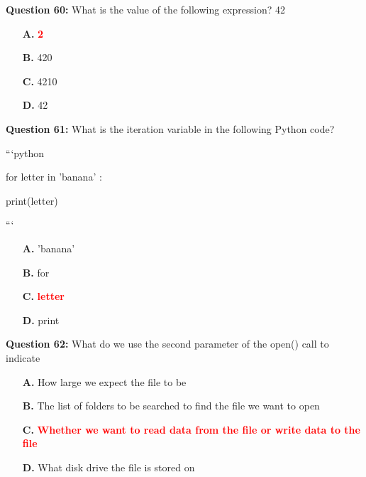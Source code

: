 \documentclass[12pt,a4paper]{article}
\begin{document}
\textbf{Question 60:} What is the value of the following expression? 42 %

\begin{itemize}
    \item[\textbf{A.}] \textcolor{red}{\textbf{2}}
    \item[\textbf{B.}] 420
    \item[\textbf{C.}] 4210
    \item[\textbf{D.}] 42
\end{itemize}

\vspace{0.5cm}

\textbf{Question 61:} What is the iteration variable in the following Python code?\newline

\newline
\newline

\newline
```python\newline

\newline
for letter in 'banana' :\newline

\newline
    print(letter)\newline

\newline
```

\begin{itemize}
    \item[\textbf{A.}] 'banana'
    \item[\textbf{B.}] for
    \item[\textbf{C.}] \textcolor{red}{\textbf{letter}}
    \item[\textbf{D.}] print
\end{itemize}

\vspace{0.5cm}

\textbf{Question 62:} What do we use the second parameter of the open() call to indicate

\begin{itemize}
    \item[\textbf{A.}] How large we expect the file to be
    \item[\textbf{B.}] The list of folders to be searched to find the file we want to open
    \item[\textbf{C.}] \textcolor{red}{\textbf{Whether we want to read data from the file or write data to the file}}
    \item[\textbf{D.}] What disk drive the file is stored on
\end{itemize}
\end{document}
